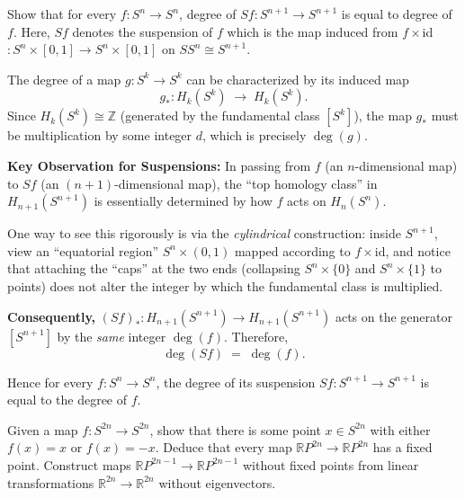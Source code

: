\documentclass[12pt]{article}
\begin{document}
\begin{statement}[2]
  Show that for every $f:S^n \to S^n$, degree of $Sf:S^{n+1} \to S^{n+1}$ is equal to degree of $f$. Here, $Sf$ denotes the suspension of $f$ 
  which is the map induced from $f \times$id$:S^n \times [0,1] \to S^n \times [0,1]$ on $SS^n \cong S^{n+1}$. 
\end{statement}
\begin{newproof}
  The degree of a map $g: S^k \to S^k$ can be characterized by its induced map 
      $$
        g_*: H_k(S^k) \;\longrightarrow\; H_k(S^k).
      $$
      Since $H_k(S^k) \cong \mathbb{Z}$ (generated by the fundamental class $[S^k]$), the map $g_*$ must be multiplication by some integer $d$, which is precisely $\deg(g)$.

    \textbf{Key Observation for Suspensions:} In passing from $f$ (an $n$-dimensional map) to $Sf$ (an $(n+1)$-dimensional map), 
      the ``top homology class'' in $H_{n+1}(S^{n+1})$ is essentially determined by how $f$ acts on $H_n(S^n)$. 

      One way to see this rigorously is via the \emph{cylindrical} construction: inside $S^{n+1}$, view an ``equatorial region'' 
      $S^n \times (0,1)$ mapped according to $f \times \mathrm{id}$, and notice that attaching the ``caps'' at the two ends (collapsing 
      $S^n \times \{0\}$ and $S^n \times \{1\}$ to points) does not alter the integer by which the fundamental class is multiplied.
    
    \textbf{Consequently,} $(Sf)_* : H_{n+1}(S^{n+1}) \to H_{n+1}(S^{n+1})$ acts on the generator $[S^{n+1}]$ by the 
      \emph{same} integer $\deg(f)$. Therefore,
      $$
        \deg(Sf) \;=\; \deg(f).
      $$

  Hence for every $f: S^n \to S^n$, the degree of its suspension $Sf: S^{n+1} \to S^{n+1}$ is equal to the degree of $f$. 
\end{newproof}


\begin{statement}[3]
  Given a map $f: S^{2n} \to S^{2n}$, show that there is some point $x \in S^{2n}$ with either $f(x)=x$ or $f(x)=-x$. Deduce that 
  every map $\mathbb{R}P^{2n} \to \mathbb{R}P^{2n}$ has a fixed point. Construct maps $\mathbb{R}P^{2n-1} \to \mathbb{R}P^{2n-1}$
  without fixed points from linear transformations $\mathbb{R}^{2n} \to \mathbb{R}^{2n}$ without eigenvectors. 
\end{statement}
\begin{newproof}

\end{newproof}
\end{document}

